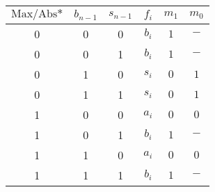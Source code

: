 \begin{tabular}{ccc|c|cc}
$\mbox{Max/Abs*}$&$b_{n-1}$&$s_{n-1}$&$f_i$&$m_1$&$m_0$\\\hline
0&0&0&$b_i$&$1$&$-$\\
0&0&1&$b_i$&$1$&$-$\\
0&1&0&$s_i$&$0$&$1$\\
0&1&1&$s_i$&$0$&$1$\\
1&0&0&$a_i$&$0$&$0$\\
1&0&1&$b_i$&$1$&$-$\\
1&1&0&$a_i$&$0$&$0$\\
1&1&1&$b_i$&$1$&$-$
\end{tabular}
